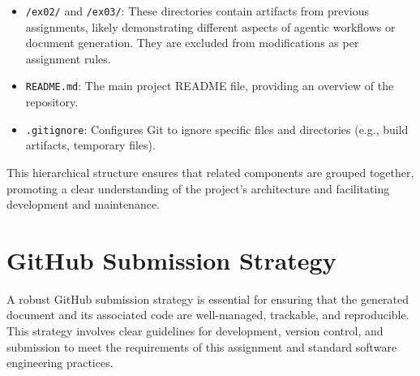 \documentclass{custom-academic-template}
\begin{document}
\begin{itemize}
\begin{itemize}
\begin{itemize}
            \end{itemize}
        \item 	\texttt{screenshots/}: Captures of intermediate or final outputs, useful for debugging and documentation.
    \end{itemize}
    \item 	\texttt{/ex02/} and 	\texttt{/ex03/}: These directories contain artifacts from previous assignments, likely demonstrating different aspects of agentic workflows or document generation. They are excluded from modifications as per assignment rules.
    \item 	\texttt{README.md}: The main project README file, providing an overview of the repository.
    \item 	\texttt{.gitignore}: Configures Git to ignore specific files and directories (e.g., build artifacts, temporary files).
\end{itemize}
This hierarchical structure ensures that related components are grouped together, promoting a clear understanding of the project's architecture and facilitating development and maintenance.

\section{GitHub Submission Strategy}
A robust GitHub submission strategy is essential for ensuring that the generated document and its associated code are well-managed, trackable, and reproducible. This strategy involves clear guidelines for development, version control, and submission to meet the requirements of this assignment and standard software engineering practices.
\end{document}
